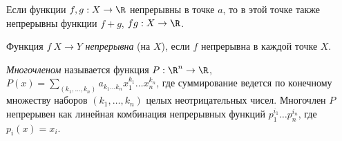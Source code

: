 \begin{corollary}
    Если функции $f, g: X \to \R$ непрерывны в точке $a$, то в этой точке также непрерывны функции $f + g$, $fg: X \to \R$.
\end{corollary}

\begin{definition}
    Функция $f \: X \to Y$ \textit{непрерывна} (на $X$), если $f$ непрерывна в каждой точке $X$.
\end{definition}

\begin{example}
    \textit{Многочленом} называется функция $P: \R^{n} \to \R$, $P(x) = \sum_{(k_{1}, \ldots, k_{n})}a_{k_{1}\ldots k_{n}}x_{1}^{k_{1}}\ldots x_{n}^{k_{n}}$, где суммирование ведется по конечному множеству наборов $(k_{1}, \ldots, k_{n})$ целых неотрицательных чисел. Многочлен $P$ непрерывен как линейная комбинация непрерывных функций $p_{1}^{i_{1}}\ldots p_{n}^{i_{n}}$, где $p_{i}(x) = x_{i}$.
\end{example}